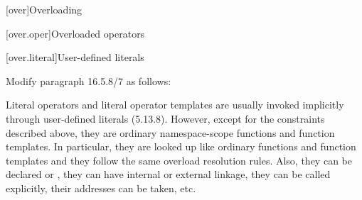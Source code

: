 
\setcounter{chapter}{15}
[over]{Overloading}

\setcounter{section}{4}
[over.oper]{Overloaded operators}

\setcounter{subsection}{7}
[over.literal]{User-defined literals}

\noindent
Modify paragraph 16.5.8/7 as follows:
\begin{std.txt}
    \resetalinea[6]
    \alinea
    \enternote
    Literal operators and literal operator templates are usually invoked 
    implicitly through user-defined literals (5.13.8). However, except for 
    the constraints described above, they are ordinary namespace-scope 
    functions and function templates. In particular, they are looked up 
    like ordinary functions and function templates and they follow the same 
    overload resolution rules. Also, they can be declared 
     or , 
    they can have internal or external linkage, they can be called explicitly, 
    their addresses can be taken, etc.
    \exitnote
\end{std.txt}
